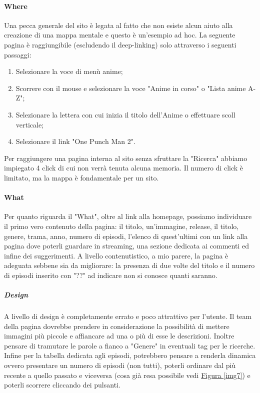 \paragraph{Where} Una pecca generale del sito è legata al fatto che non esiste alcun aiuto alla creazione di una mappa mentale e questo è un'esempio ad hoc. La seguente pagina è raggiungibile (escludendo il deep-linking) solo attraverso i seguenti passaggi: 
\begin{enumerate}
	\item Selezionare la voce di menù anime;
	\item Scorrere con il mouse e selezionare la voce "Anime in corso" o "Lista anime A-Z";
	\newpage
	\item Selezionare la lettera con cui inizia il titolo dell'Anime o effettuare scoll verticale;
	\item Selezionare il link "One Punch Man 2". 
\end{enumerate}
Per raggiungere una pagina interna al sito senza sfruttare la "Ricerca" abbiamo impiegato 4 click di cui non verrà tenuta alcuna memoria. Il numero di click è limitato, ma la mappa è fondamentale per un sito.

\paragraph{What} Per quanto riguarda il "What", oltre al link alla homepage, possiamo individuare il primo vero contenuto della pagina: il titolo, un'immagine, release, il titolo, genere, trama, anno, numero di episodi, l'elenco di quest'ultimi con un link alla pagina dove poterli guardare in streaming, una sezione dedicata ai commenti ed infine dei suggerimenti.
A livello contenutistico, a mio parere, la pagina è adeguata sebbene sia da migliorare: la presenza di due volte del titolo e il numero di episodi inserito con "??" ad indicare non si conosce quanti saranno.

\subparagraph{Design} 
A livello di design è completamente errato e poco attrattivo per l'utente. Il team della pagina dovrebbe prendere in considerazione la possibilità di mettere immagini più piccole e affiancare ad una o più di esse le descrizioni. Inoltre pensare di tramutare le parole a fianco a "Genere" in eventuali tag per le ricerche.
Infine per la tabella dedicata agli episodi, potrebbero pensare a renderla dinamica ovvero presentare un numero di episodi (non tutti), poterli ordinare dal più recente a quello passato e viceversa (cosa già resa possibile vedi \hyperref[img7]{Figura \ref{img7}}) e poterli scorrere cliccando dei pulsanti.

